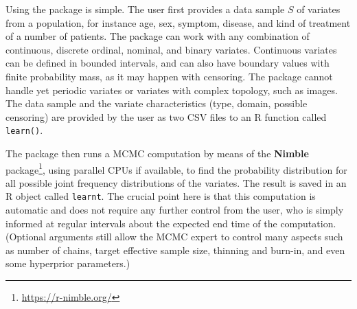 Using the package is simple. The user first provides a data sample $S$ of variates from a population, for instance age, sex, symptom, disease, and kind of treatment of a number of patients. The package can work with any combination of continuous, discrete ordinal, nominal, and binary variates. Continuous variates can be defined in bounded intervals, and can also have boundary values with finite probability mass, as it may happen with censoring. The package cannot handle yet periodic variates or variates with complex topology, such as images. The data sample and the variate characteristics (type, domain, possible censoring) are provided by the user as two CSV files to an R function called \texttt{learn()}.

The package then runs a MCMC computation by means of the \textbf{Nimble} package\footnote{\url{https://r-nimble.org/}}, using parallel CPUs if available, to find the probability distribution for all possible joint frequency distributions of the variates. The result is saved in an R object called \texttt{learnt}. The crucial point here is that this computation is automatic and does not require any further control from the user, who is simply informed at regular intervals about the expected end time of the computation. (Optional arguments still allow the MCMC expert to control many aspects such as number of chains, target effective sample size, thinning and burn-in, and even some hyperprior parameters.)

